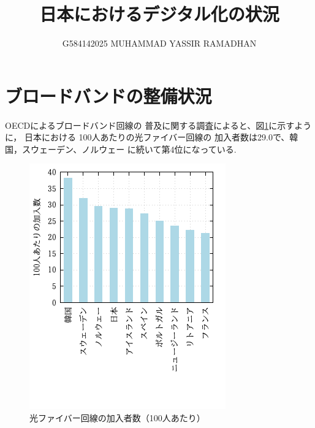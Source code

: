 \documentclass[a4paper,11pt,dvipdfmx]{ujarticle}
\title{日本におけるデジタル化の状況}
\author{G584142025 MUHAMMAD YASSIR RAMADHAN}
\begin{document}
\maketitle %

\section{ブロードバンドの整備状況}

OECDによるブロードバンド回線の
普及に関する調査\cite{oecd}によると、図\ref{fiber}に示すように，
日本における 100人あたりの光ファイバー回線の
加入者数は29.0で、韓国，スウェーデン、ノルウェー
に続いて第4位になっている.

\begin{figure}[htbp]
    \centering
    \includegraphics{latexpng.png}
    \caption{光ファイバー回線の加入者数（100人あたり）}
    \label{fiber}
\end{figure}
\end{document}

